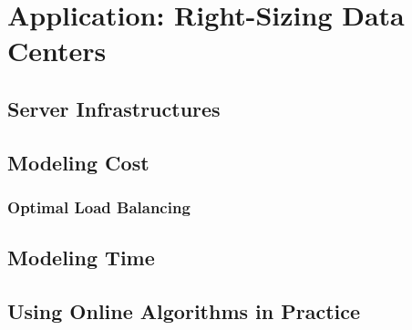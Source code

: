 
\chapter{Application: Right-Sizing Data Centers}\label{chapter:application_data_centers}

\section{Server Infrastructures}

\section{Modeling Cost}

\subsection{Optimal Load Balancing}

\section{Modeling Time}

\section{Using Online Algorithms in Practice}
